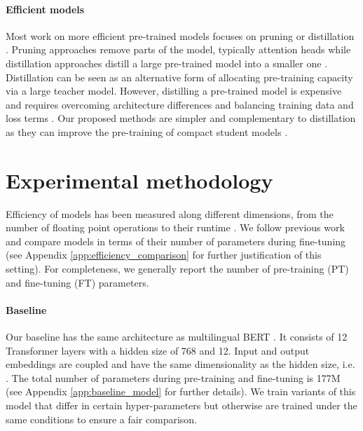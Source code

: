 \documentclass{article} \usepackage{iclr2021_conference,times}
\begin{document}
\paragraph{Efficient models} Most work on more efficient pre-trained models focuses on pruning or distillation \citep{Hinton2015}. Pruning approaches remove parts of the model, typically attention heads \citep{Michel2019,Voita2019} while distillation approaches distill a large pre-trained model into a smaller one \citep{Sun2020mobilebert}. Distillation can be seen as an alternative form of allocating pre-training capacity via a large teacher model. However, distilling a pre-trained model is expensive \citep{Sanh2019distilbert} and requires overcoming architecture differences and balancing training data and loss terms \citep{Mukherjee2020xtremedistil}. Our proposed methods are simpler and complementary to distillation as they can improve the pre-training of compact student models \citep{Turc2019well-read}.









\section{Experimental methodology}
\label{sec:experiments}

Efficiency of models has been measured along different dimensions, from the number of floating point operations \citep{Schwartz2019greenai} to their runtime \citep{Zhou2020hulk}. We follow previous work \citep{Sun2020mobilebert} and compare models in terms of their number of parameters during fine-tuning (see Appendix \ref{app:efficiency_comparison} for further justification of this setting). For completeness, we generally report the number of pre-training (PT) and fine-tuning (FT) parameters.







\paragraph{Baseline} Our baseline has the same architecture as multilingual BERT \citep[mBERT;][]{Devlin2019}. It consists of 12 Transformer layers with a hidden size  of 768 and 12. Input and output embeddings are coupled and have the same dimensionality  as the hidden size, i.e. . The total number of parameters during pre-training and fine-tuning is 177M (see Appendix \ref{app:baseline_model} for further details). We train variants of this model that differ in certain hyper-parameters but otherwise are trained under the same conditions to ensure a fair comparison.
\end{document}
